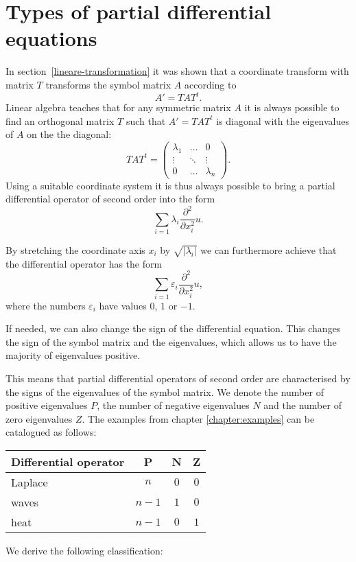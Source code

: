 %
%
%
\section{Types of partial differential equations}
In section~\ref{lineare-transformation}
it was shown that a coordinate transform with matrix $T$ transforms
the symbol matrix $A$ according to
\[
A'=TAT^t .
\]
Linear algebra teaches that for any symmetric matrix $A$ it is always possible 
to find an orthogonal matrix $T$ such that $A'=TAT^t$ is diagonal with
the eigenvalues of $A$ on the the diagonal:
\[
TAT^t
=
\begin{pmatrix}\lambda_1&\dots&0\\
\vdots&\ddots&\vdots\\
0&\dots&\lambda_n
\end{pmatrix}.
\]
Using a suitable coordinate system it is thus always possible to 
bring a partial differential operator of second order into the form
\[
\sum_{i=1}\lambda_i\frac{\partial^2}{\partial x_i^2}u.
\]

By stretching the coordinate axis $x_i$ by 
$\sqrt{|\lambda_i|}$
we can furthermore achieve that the differential operator
has the form
\[
\sum_{i=1}\varepsilon_i\frac{\partial^2}{\partial x_i^2}u,
\]
where the numbers $\varepsilon_i$ have values $0$, $1$ or $-1$.

If needed, we can also change the sign of the differential equation.
This changes the sign of the symbol matrix and the eigenvalues, which
allows us to have the majority of eigenvalues positive.

This means that partial differential operators of second order are
characterised by the signs of the eigenvalues of the symbol matrix.
We denote the number of positive eigenvalues $P$, the number of negative
eigenvalues $N$ and the number of zero eigenvalues $Z$.
The examples from chapter \ref{chapter:examples}
can be catalogued as follows:
\begin{center}
\begin{tabular}{l|ccc}
Differential operator&P&N&Z
\\
\hline
Laplace&
$n$&$0$&$0$
\\
waves&
$n-1$&$1$&$0$
\\
heat&
$n-1$&$0$&$1$
\end{tabular}
\end{center}
We derive the following classification:

